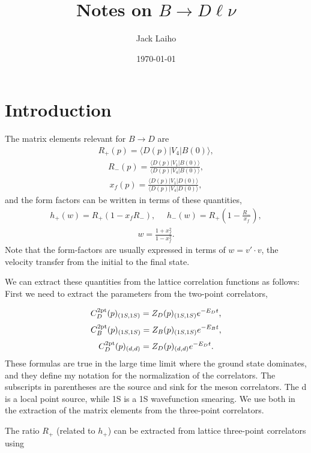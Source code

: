 \documentclass[11pt]{article}
\def\bea{\begin{eqnarray}}
\def\eea{\end{eqnarray}}
\begin{document}
\title{Notes on $B\to D\ell\nu$}

\author{Jack Laiho}


\date{\today}

\maketitle

\section{Introduction}

The matrix elements relevant for $B\to D$ are
%
\bea\label{eq:R+} R_+(p) = \langle D(p)|V_4 |B(0) \rangle,
\eea
%
\bea\label{eq:R-} R_-(p) = \frac{\langle D(p)|V_1 |B(0) \rangle}{\langle D(p)|V_4 |B(0) \rangle},
\eea
%
\bea\label{eq:xf} x_f(p) = \frac{\langle D(p)|V_1 |D(0) \rangle}{\langle D(p)|V_4 |D(0) \rangle},
\eea
%
and the form factors can be written in terms of these quantities,
%
\bea h_+(w)=R_+(1-x_f R_-), \ \ \ \ \ \ h_-(w)=R_+\left(1-\frac{R_-}{x_f}\right),
\eea
%
\bea  w=\frac{1+x_f^2}{1-x_f^2}.
\eea
%
Note that the form-factors are usually expressed in terms of $w=v' \cdot v$, the velocity transfer from the initial to the final state.

We can extract these quantities from the lattice correlation functions as follows:  First we need to extract the parameters from the two-point correlators,

\bea C_D^{\rm 2pt}(p)_{(1S,1S)}=Z_D(p)_{(1S,1S)}e^{-E_Dt},
\eea
%
\bea C_B^{\rm 2pt}(p)_{(1S,1S)}=Z_B(p)_{(1S,1S)}e^{-E_Bt},
\eea
%
\bea C_D^{\rm 2pt}(p)_{(d,d)}=Z_D(p)_{(d,d)}e^{-E_Dt}.
\eea
%
These formulas are true in the large time limit where the ground state dominates, and they define my notation for the normalization of the correlators.  The subscripts in parentheses are the source and sink for the meson correlators.  The d is a local point source, while 1S is a 1S wavefunction smearing.  We use both in the extraction of the matrix elements from the three-point correlators.


The ratio $R_{+}$ (related to $h_+$) can be extracted from lattice three-point correlators using
\end{document}
